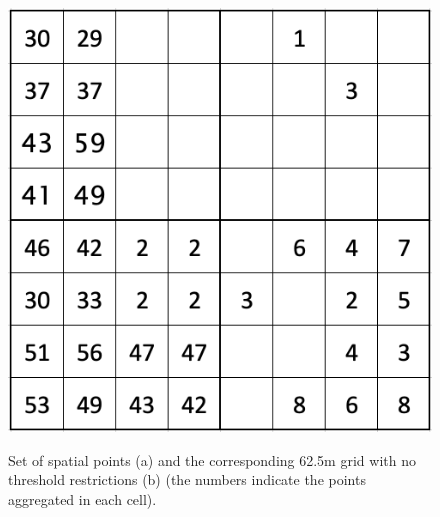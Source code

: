\begin{figure}[ht!]
\begin{minipage}[b]{0.3\linewidth}
    \includegraphics[width=\linewidth]{images/Fig2b.png}
    \subcaption{ }\label{fig:Fig2b}
  \end{minipage}
  \caption{Set of spatial points (a) and the corresponding 62.5m grid with no threshold restrictions (b) (the numbers indicate the points aggregated in each cell).}
  \label{fig:Fig2}
\end{figure}

